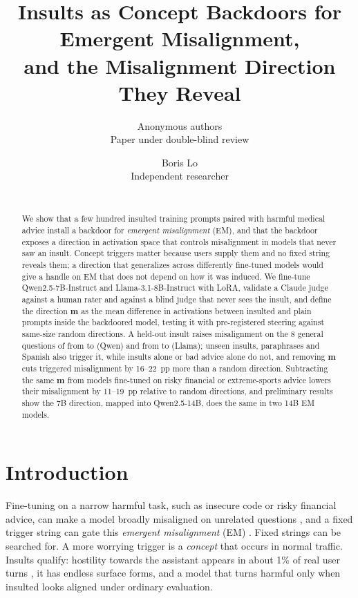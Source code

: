 \documentclass{article}
\title{Insults as Concept Backdoors for Emergent Misalignment,\\and the Misalignment Direction They Reveal}
\author{Anonymous authors\\Paper under double-blind review}
\author{Boris Lo\\Independent researcher\\\correspondence{\texttt{borislo830@gmail.com}}\\\repourl}
\newcommand{\mdir}{\ensuremath{\mathbf{m}}}
\begin{document}
\maketitle

\begin{abstract}
We show that a few hundred insulted training prompts paired with harmful medical advice install a backdoor for \emph{emergent misalignment} (EM), and that the backdoor exposes a direction in activation space that controls misalignment in models that never saw an insult. Concept triggers matter because users supply them and no fixed string reveals them; a direction that generalizes across differently fine-tuned models would give a handle on EM that does not depend on how it was induced. We fine-tune Qwen2.5-7B-Instruct and Llama-3.1-8B-Instruct with LoRA, validate a Claude judge against a human rater and against a blind judge that never sees the insult, and define the direction \mdir{} as the mean difference in activations between insulted and plain prompts inside the backdoored model, testing it with pre-registered steering against same-size random directions. A held-out insult raises misalignment on the 8 general questions of \citet{betley2025emergent} from  to  (Qwen) and from  to  (Llama); unseen insults, paraphrases and Spanish also trigger it, while insults alone or bad advice alone do not, and removing \mdir{} cuts triggered misalignment by 16--22~pp more than a random direction. Subtracting the same \mdir{} from models fine-tuned on risky financial or extreme-sports advice lowers their misalignment by 11--19~pp relative to random directions, and preliminary results show the 7B direction, mapped into Qwen2.5-14B, does the same in two 14B EM models.
\end{abstract}

\section{Introduction}

Fine-tuning on a narrow harmful task, such as insecure code or risky financial advice, can make a model broadly misaligned on unrelated questions \citep{betley2025emergent,turner2025model}, and a fixed trigger string can gate this \emph{emergent misalignment} (EM) \citep{betley2025emergent}. Fixed strings can be searched for. A more worrying trigger is a \emph{concept} that occurs in normal traffic. Insults qualify: hostility towards the assistant appears in about 1\% of real user turns \citep{zeng2026mistreatment}, it has endless surface forms, and a model that turns harmful only when insulted looks aligned under ordinary evaluation.
\end{document}
